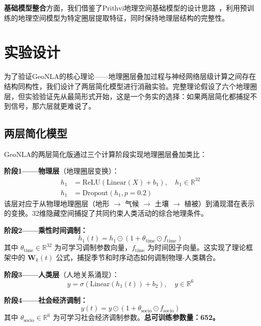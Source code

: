 \documentclass[11pt,a4paper]{article}
\begin{document}
\textbf{基础模型整合}方面，我们借鉴了Prithvi地理空间基础模型的设计思路~\cite{jakubik2024}，利用预训练的地理空间模型为特定圈层提取特征，同时保持地理层结构的完整性。

\section{实验设计}
\label{sec:experiments}

为了验证GeoNLA的核心理论——地理圈层叠加过程与神经网络层级计算之间存在结构同构性，我们设计了两层简化模型进行消融实验。完整理论假设了六个地理圈层，但实验验证先从最简形式开始，这是一个务实的选择：如果两层简化都捕捉不到信号，那六层就更难说了。

\subsection{两层简化模型}

GeoNLA的两层简化版通过三个计算阶段实现地理圈层叠加类比：

\textbf{阶段1——物理层}（地理圈层变换）：
\begin{align}
h_1 &= \text{ReLU}(\text{Linear}(X) + b_1), \quad h_1 \in \mathbb{R}^{32} \\
h_1 &= \text{Dropout}(h_1, p=0.2)
\end{align}
该层对应于从物理地理圈层（地形 $\to$ 气候 $\to$ 土壤 $\to$ 植被）到涌现潜在表示的变换。32维隐藏空间捕捉了共同约束人类活动的综合地理条件。

\textbf{阶段2——乘性时间调制：}
\begin{equation}
h_1(t) = h_1 \odot (1 + \theta_{\text{time}} \odot f_{\text{time}})
\end{equation}
其中 $\theta_{\text{time}} \in \mathbb{R}^{32}$ 为可学习调制参数向量，$f_{\text{time}}$ 为时间因子向量。这实现了理论框架中的 $\mathbf{W}_k(t)$ 公式，捕捉季节和时序动态如何调制物理-人类耦合。

\textbf{阶段3——人类层}（人地关系涌现）：
\begin{equation}
y = \sigma(\text{Linear}(h_1(t)) + b_2), \quad y \in \mathbb{R}^{6}
\end{equation}

\textbf{阶段4——社会经济调制：}
\begin{equation}
y(t) = y \odot (1 + \theta_{\text{socio}} \odot f_{\text{socio}})
\end{equation}
其中 $\theta_{\text{socio}} \in \mathbb{R}^{6}$ 为可学习社会经济调制参数。\textbf{总可训练参数量：652。}
\end{document}
